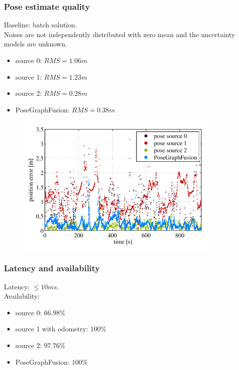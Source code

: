 \documentclass[letterpaper,10pt]{article}
\begin{document}
\subsubsection{Pose estimate quality}
Baseline: batch solution.\\
Noises are not independently distributed with zero mean and the uncertainty models are unknown. 
\begin{itemize}
	\item source 0: $RMS=1.06m$
	\item source 1: $RMS=1.23m$
	\item source 2: $RMS=0.28m$
	\item PoseGraphFusion: $RMS=0.38m$
\end{itemize}
\begin{figure}[!ht]
	\centering
	\includegraphics[width=10cm]{./img/error.png}
\end{figure}

\subsubsection{Latency and availability}
Latency: $\leq 10ms$.\\
Availability:
\begin{itemize}
	\item source 0: $66.98\%$
	\item source 1 with odometry: $100\%$
	\item source 2: $97.76\%$
	\item PoseGraphFusion: $100\%$
\end{itemize}
\end{document}
